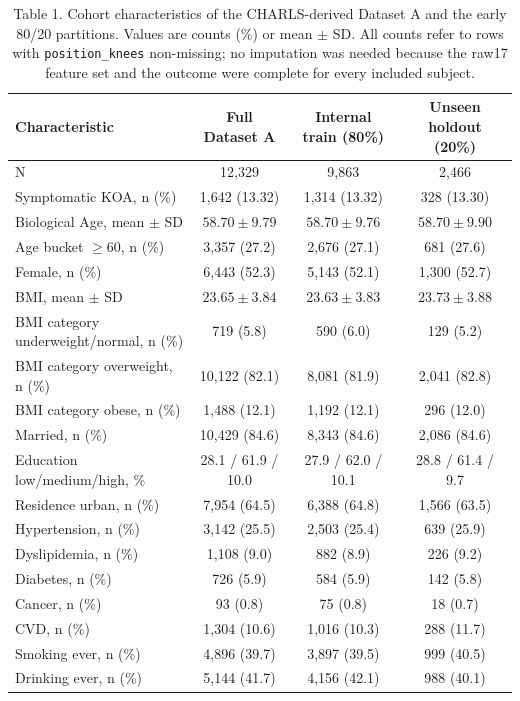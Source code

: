 \documentclass[11pt,a4paper]{article}
\begin{document}
\begin{table}[h!]
\centering
\small
\caption{Table 1. Cohort characteristics of the CHARLS-derived Dataset A and the early 80/20 partitions. Values are counts (\%) or mean $\pm$ SD. All counts refer to rows with \texttt{position\_knees} non-missing; no imputation was needed because the raw17 feature set and the outcome were complete for every included subject.}
\label{tab:table1}
\begin{tabular}{lccc}
\toprule
Characteristic & Full Dataset A & Internal train (80\%) & Unseen holdout (20\%) \\
\midrule
N & 12{,}329 & 9{,}863 & 2{,}466 \\
Symptomatic KOA, n (\%) & 1{,}642 (13.32) & 1{,}314 (13.32) & 328 (13.30) \\
Biological Age, mean $\pm$ SD & $58.70 \pm 9.79$ & $58.70 \pm 9.76$ & $58.70 \pm 9.90$ \\
Age bucket $\geq 60$, n (\%) & 3{,}357 (27.2) & 2{,}676 (27.1) & 681 (27.6) \\
Female, n (\%) & 6{,}443 (52.3) & 5{,}143 (52.1) & 1{,}300 (52.7) \\
BMI, mean $\pm$ SD & $23.65 \pm 3.84$ & $23.63 \pm 3.83$ & $23.73 \pm 3.88$ \\
BMI category underweight/normal, n (\%) & 719 (5.8) & 590 (6.0) & 129 (5.2) \\
BMI category overweight, n (\%) & 10{,}122 (82.1) & 8{,}081 (81.9) & 2{,}041 (82.8) \\
BMI category obese, n (\%) & 1{,}488 (12.1) & 1{,}192 (12.1) & 296 (12.0) \\
Married, n (\%) & 10{,}429 (84.6) & 8{,}343 (84.6) & 2{,}086 (84.6) \\
Education low/medium/high, \% & 28.1 / 61.9 / 10.0 & 27.9 / 62.0 / 10.1 & 28.8 / 61.4 / 9.7 \\
Residence urban, n (\%) & 7{,}954 (64.5) & 6{,}388 (64.8) & 1{,}566 (63.5) \\
Hypertension, n (\%) & 3{,}142 (25.5) & 2{,}503 (25.4) & 639 (25.9) \\
Dyslipidemia, n (\%) & 1{,}108 (9.0) & 882 (8.9) & 226 (9.2) \\
Diabetes, n (\%) & 726 (5.9) & 584 (5.9) & 142 (5.8) \\
Cancer, n (\%) & 93 (0.8) & 75 (0.8) & 18 (0.7) \\
CVD, n (\%) & 1{,}304 (10.6) & 1{,}016 (10.3) & 288 (11.7) \\
Smoking ever, n (\%) & 4{,}896 (39.7) & 3{,}897 (39.5) & 999 (40.5) \\
Drinking ever, n (\%) & 5{,}144 (41.7) & 4{,}156 (42.1) & 988 (40.1) \\
\bottomrule
\end{tabular}
\end{table}
\end{document}
